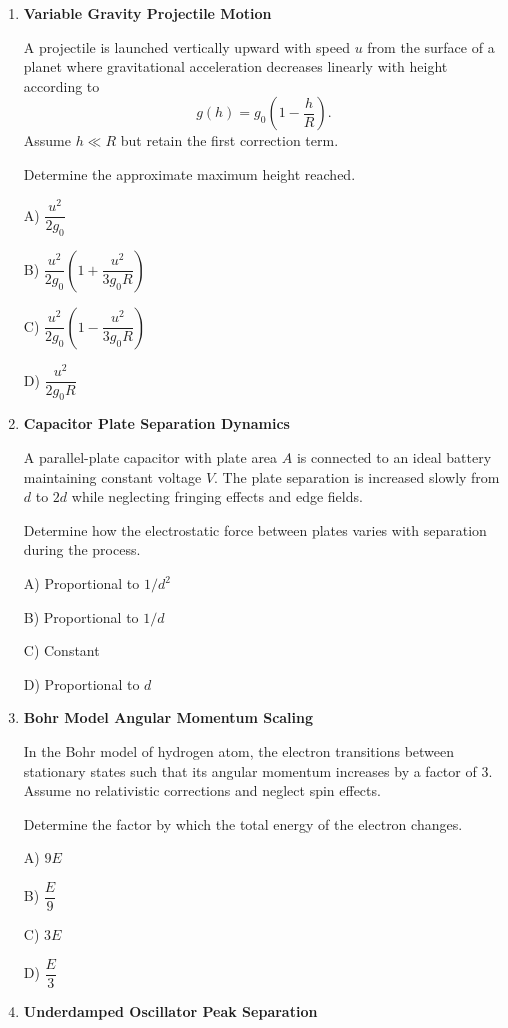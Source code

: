 \documentclass[12pt]{article}
\begin{document}
\begin{enumerate}
A) $0$

B) $\dfrac{B\omega R^2}{2}$

C) $B\omega R^2$

D) $\dfrac{B\omega R}{2}$

\item \textbf{Variable Gravity Projectile Motion}

A projectile is launched vertically upward with speed $u$ from the surface of a planet where gravitational acceleration decreases linearly with height according to  
\[
g(h) = g_0\left(1 - \frac{h}{R}\right).
\]
Assume $h \ll R$ but retain the first correction term.

Determine the approximate maximum height reached.

A) $\dfrac{u^2}{2g_0}$

B) $\dfrac{u^2}{2g_0}\left(1+\dfrac{u^2}{3g_0R}\right)$

C) $\dfrac{u^2}{2g_0}\left(1-\dfrac{u^2}{3g_0R}\right)$

D) $\dfrac{u^2}{2g_0R}$

\item \textbf{Capacitor Plate Separation Dynamics}

A parallel-plate capacitor with plate area $A$ is connected to an ideal battery maintaining constant voltage $V$. The plate separation is increased slowly from $d$ to $2d$ while neglecting fringing effects and edge fields.

Determine how the electrostatic force between plates varies with separation during the process.

A) Proportional to $1/d^2$

B) Proportional to $1/d$

C) Constant

D) Proportional to $d$

\item \textbf{Bohr Model Angular Momentum Scaling}

In the Bohr model of hydrogen atom, the electron transitions between stationary states such that its angular momentum increases by a factor of 3. Assume no relativistic corrections and neglect spin effects.

Determine the factor by which the total energy of the electron changes.

A) $9E$

B) $\dfrac{E}{9}$

C) $3E$

D) $\dfrac{E}{3}$

\item \textbf{Underdamped Oscillator Peak Separation}


\end{enumerate}
\end{document}
